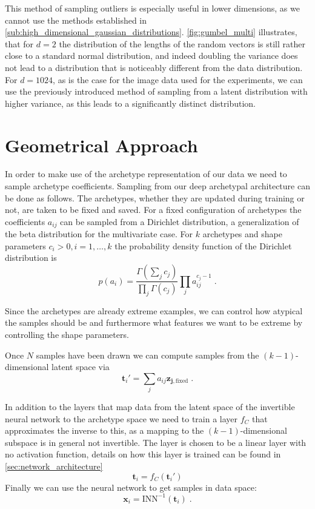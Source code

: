 This method of sampling outliers is especially useful in lower dimensions, as
we cannot use the methods established in
\autoref{sub:high_dimensional_gaussian_distributions}. 
\autoref{fig:gumbel_multi} illustrates, that for $d=2$ the distribution of the lengths of
the random vectors is still rather close to a standard normal distribution, and
indeed doubling the variance does not lead to a distribution that is noticeably
different from the data distribution. For $d=1024$, as is the case for the
image data used for the experiments, we can use the previously introduced
method of sampling from a latent distribution with higher variance, as this
leads to a significantly distinct distribution.

\section{Geometrical Approach}%
\label{sec:geometrical_approach}

In order to make use of the archetype representation of our data we need to
sample archetype coefficients. Sampling from our deep archetypal architecture
can be done as follows. The archetypes, whether they are updated during training
or not, are taken to be fixed and saved. For a fixed configuration of
archetypes the coefficients $a_{ij}$ can be sampled from a Dirichlet distribution,
a generalization of the beta distribution for the multivariate case. For $k$
archetypes and shape parameters $c_i > 0, i = 1, \dots, k$ the probability
density function of the Dirichlet distribution is
\begin{equation}%
	\label{eq:dirichlet_pdf}
	p(a_i) = \frac{ \Gamma ( \sum_j c_j ) }{ \prod_j \Gamma (c_j) } \prod_j
	a_{ij}^{c_j - 1}\;.
\end{equation}
\citep{forbesDirichletDistribution2010}

Since the archetypes are already extreme examples, we can control how atypical
the samples should be and furthermore what features we want to be extreme by
controlling the shape parameters.

Once $N$ samples have been drawn we can compute samples from the
$(k-1)$-dimensional latent space via
\begin{equation}%
	\label{eq:aa_k_sample}
	\mathbf{t}_i' = \sum_j a_{ij} \mathbf{z_{j,\mathrm{fixed}}}\;.
\end{equation}

In addition to the layers that map data from the latent space of the invertible
neural network to the archetype space we need to train a layer $f_C$ that
approximates the inverse to this, as a mapping to the $(k-1)$-dimensional
subspace is in general not invertible. The layer is chosen to be a linear layer
with no activation function, details on how this layer is trained can
be found in \autoref{sec:network_architecture}
\begin{equation}%
	\label{eq:aa_upsample}
	\mathbf{t}_i = f_C (\mathbf{t}_i')
\end{equation}
Finally we can use the neural network to get samples in data space:
\begin{equation}%
	\label{eq:aa_to_data}
	\mathbf{x}_i = \mathrm{INN}^{-1} (\mathbf{t}_i)\;.
\end{equation}

